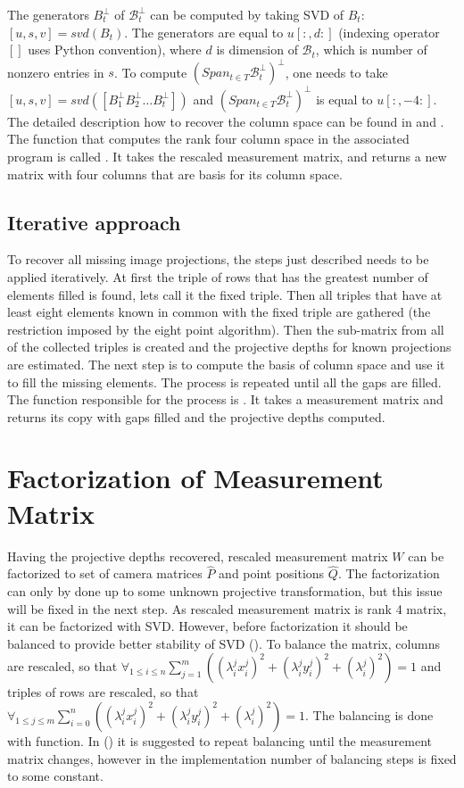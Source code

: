 \documentclass[12pt]{article}
\begin{document}
The generators $B_t^\bot$ of $\mathcal{B}_t^\bot$ can be computed by taking SVD of $B_t$: $[u, s, v] = svd(B_t)$. The generators are equal to $u[:, d:]$ (indexing operator $[]$ uses Python convention), where $d$ is dimension of $\mathcal{B}_t$, which is number of nonzero entries in $s$.
To compute $(Span_{t \in T} \mathcal{B}_t^\bot)^\bot$, one needs to take $[u, s, v] = svd([B_1^\bot B_2^\bot \dots B_t^\bot])$ and $(Span_{t \in T} \mathcal{B}_t^\bot)^\bot$ is equal to $u[:, -4:]$.
The detailed description how to recover the column space can be found in \cite{jacobs99} and \cite{svoboda04}. The function that computes the rank four column space in the associated program is called . It takes the rescaled measurement matrix, and returns a new matrix with four columns that are basis for its column space.

\subsection{Iterative approach}
To recover all missing image projections, the steps just described needs to be applied iteratively. At first the triple of rows that has the greatest number of elements filled is found, lets call it the fixed triple. Then all triples that have at least eight elements known in common with the fixed triple are gathered (the restriction imposed by the eight point algorithm). Then the sub-matrix from all of the collected triples is created and the projective depths for known projections are estimated. The next step is to compute the basis of column space and use it to fill the missing elements. The process is repeated until all the gaps are filled. The function responsible for the process is . It takes a measurement matrix  and returns its copy with gaps filled and the projective depths computed.

\section{Factorization of Measurement Matrix}
Having the projective depths recovered, rescaled measurement matrix $W$ can be factorized to set of camera matrices $\hat{P}$ and point positions $\hat{Q}$. The factorization can only by done up to some unknown projective transformation, but this issue will be fixed in the next step. As rescaled measurement matrix is rank 4 matrix, it can be factorized with SVD. However, before factorization it should be balanced to provide better stability of SVD (\cite{sturm96}). To balance the matrix, columns are rescaled, so that $\forall_{1 \leq i \leq n} \sum_{j=1}^m \left( (\lambda _i^j x_i^j)^2 + (\lambda _i^j y_i^j)^2 + (\lambda _i^j)^2 \right) = 1$ and triples of rows are rescaled, so that $\forall_{1 \leq j \leq m} \sum_{i=0}^n \left( (\lambda _i^j x_i^j)^2 + (\lambda _i^j y_i^j)^2 + (\lambda _i^j)^2 \right) = 1$. The balancing is done with  function. In (\cite{sturm96}) it is suggested to repeat balancing until the measurement matrix changes, however in the implementation number of balancing steps is fixed to some constant.
\end{document}
